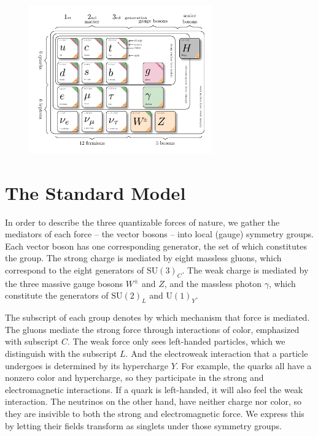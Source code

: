 % 
\begin{figure}[!h]
    \centering
    \includegraphics[width=0.7\textwidth]{figures/SM_figure.pdf}
\end{figure}
\section{The Standard Model}\label{ch:SM}
In order to describe the three quantizable forces of nature, we gather the mediators of each force -- the vector bosons -- into local (gauge) symmetry groups. 
Each vector boson has one corresponding generator, the set of which constitutes the group.
The strong charge is mediated by eight massless gluons, which correspond to the eight generators of $\text{SU}(3)_C$. 
The weak charge is mediated by the three massive gauge bosons $W^\pm$ and $Z$, and the massless photon $\gamma$, 
which constitute the generators of $\text{SU}(2)_L$ and $\text{U}(1)_Y$. 

The subscript of each group denotes by which mechanism that force is mediated. The gluons mediate the strong force through interactions of color, emphasized with subscript $C$. The weak force only sees left-handed particles, 
which we distinguish with the subscript $L$. And the electroweak interaction that a particle undergoes is determined by its hypercharge $Y$. For example, the quarks all have a nonzero color and hypercharge, 
so they participate in the strong and electromagnetic interactions. If a quark is left-handed, it will also feel the weak interaction. The neutrinos on the other hand, have neither charge nor color, 
so they are insivible to both the strong and electromagnetic force. We express this by letting their fields transform as singlets under those symmetry groups.

